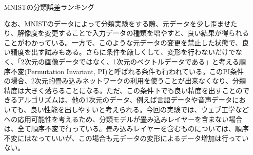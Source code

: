 \begin{table}[htbp]
\begin{center}
  \caption{MNISTの分類誤差ランキング}

  \label{c5_mnist_rank}%
  \end{center}
\end{table}%
なお、MNISTのデータによって分類実験をする際、元データを少し歪ませたり、解像度を変更することで入力データの種類を増やすと、良い結果が得られることがわかっている\cite{simard2003best}\cite{lauer2007a-trainable}。一方で、このような元データの変更を禁止した状態で、良い精度を出す試みもある。さらに条件を厳しくして、変形を行わないだけでなく、「2次元の画像データではなく、1次元のベクトルデータである」と考える順序不変(Permutation Invariant, PI)と呼ばれる条件も行われている。このPI条件の場合、2次元的畳み込みネットワークの利用を使うことが出来なくなり、分類精度は大きく落ちることになる。ただ、この条件下でも良い精度を出すことのできるアルゴリズムは、他の1次元のデータ、例えば言語データや音声データにおいても、良い性能を出しやすいと考えられる。今回の実験では、ウェブ工学などへの応用可能性を考えるため、分類モデルが畳み込みレイヤーを含まない場合は、全て順序不変で行っている。畳み込みレイヤーを含むものについては、順序不変にはなっていいが、この場合も元データの変形によるデータ増加は行っていない。

